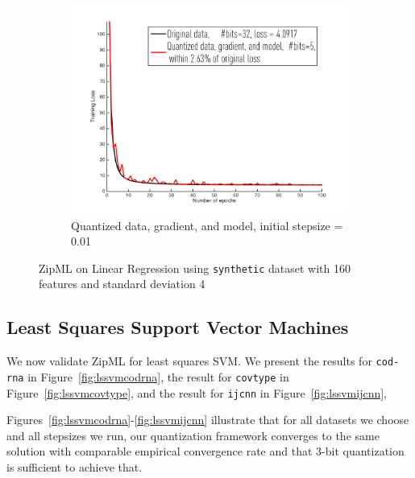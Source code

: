 \documentclass{article}
\begin{document}
\begin{figure}[h]
\begin{subfigure}[h]{.3\columnwidth}
    \includegraphics[width=\columnwidth]{lr/synthetic/160hard/dgm001}
     \caption{Quantized data, gradient, and model, initial stepsize = 0.01}
    \end{subfigure}
    
\caption{ZipML on Linear Regression using \texttt{synthetic} dataset with 160 features and standard deviation 4}
\label{fig:lr160hard}
\end{figure}




\subsection{Least Squares Support Vector Machines}

We now validate ZipML for least squares SVM.
We present the results for \texttt{cod-rna} in Figure~\ref{fig:lssvmcodrna}, the result for \texttt{covtype} in Figure~\ref{fig:lssvmcovtype}, and the result for \texttt{ijcnn} in Figure~\ref{fig:lssvmijcnn},

Figures~\ref{fig:lssvmcodrna}-\ref{fig:lssvmijcnn} illustrate that for all datasets we choose and all stepsizes we run, our quantization framework
converges to the same solution with comparable
empirical convergence rate and that 3-bit quantization is sufficient to achieve that.
\end{document}
